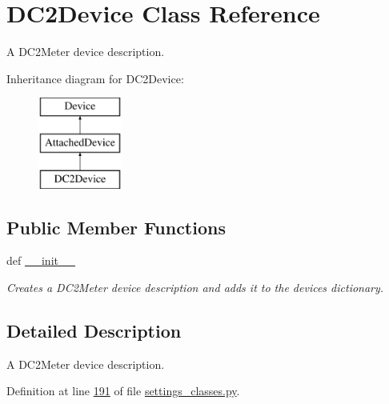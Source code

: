 \hypertarget{classsettings__classes_1_1_d_c2_device}{\section{\-D\-C2\-Device \-Class \-Reference}
\label{classsettings__classes_1_1_d_c2_device}
}


\-A \-D\-C2\-Meter device description.  


\-Inheritance diagram for \-D\-C2\-Device\-:\begin{figure}[H]
\begin{center}
\leavevmode
\includegraphics[height=3.000000cm]{classsettings__classes_1_1_d_c2_device}
\end{center}
\end{figure}
\subsection*{\-Public \-Member \-Functions}
\begin{DoxyCompactItemize}
\item 
def \hyperlink{classsettings__classes_1_1_d_c2_device_ac775ee34451fdfa742b318538164070e}{\-\_\-\-\_\-init\-\_\-\-\_\-}
\begin{DoxyCompactList}\small\item\em \-Creates a \-D\-C2\-Meter device description and adds it to the devices dictionary. \end{DoxyCompactList}\end{DoxyCompactItemize}


\subsection{\-Detailed \-Description}
\-A \-D\-C2\-Meter device description. 

\-Definition at line \hyperlink{settings__classes_8py_source_l00191}{191} of file \hyperlink{settings__classes_8py_source}{settings\-\_\-classes.\-py}.



